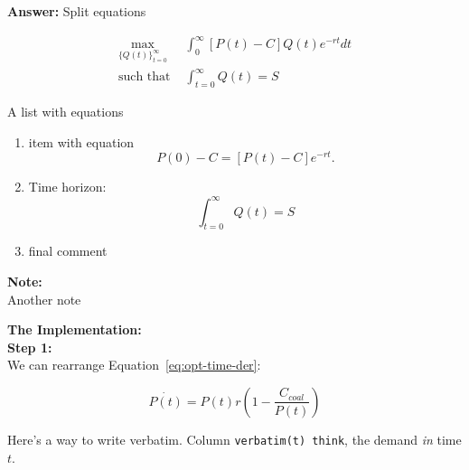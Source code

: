 \begin{enumerate}
\begin{Exercise}
\begin{sol}
    
    
    
    
    \end{sol}
    
    
    \begin{sol}
    \textbf{Answer:} Split equations
    
        \begin{equation}
        \begin{split}
            \max_{ \{Q(t)\}_{t=0}^\infty} & \int_{0}^\infty \left[P(t)-C\right] Q(t) e^{-rt}dt\\
            \text{such that } & \int_{t=0}^\infty Q(t) = S
        \end{split}
        \label{eq:npv}
        \end{equation}
        
        A list with equations
        
        \begin{enumerate}
            \item item with equation
            \begin{equation*}
                P(0)-C = [P(t)-C]e^{-rt}.
            \end{equation*}
            \item Time horizon:
            \begin{equation*}
                \int_{t=0}^\infty Q(t) = S
            \end{equation*}
            \item final comment
        \end{enumerate}
        
        \textbf{Note:}\\
        
        Another note
        
        \textbf{The Implementation:}\\
        
                \noindent 
                \textbf{Step 1:}\\        
        We can rearrange Equation~\eqref{eq:opt-time-der}:
        
        \begin{equation*}
            \dot{P(t)}=P(t)r\left(1-\frac{C_{coal}}{P(t)}\right)
        \end{equation*}
        
        
        Here's a way to write verbatim. Column \texttt{verbatim(t) think}, the demand \textit{in} time $t$.


\end{sol}
\end{Exercise}
\end{enumerate}

